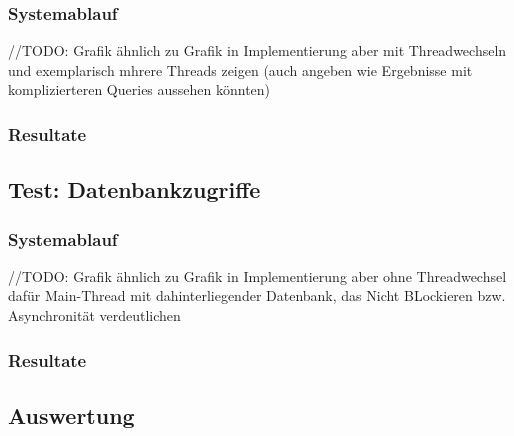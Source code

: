 \subsubsection{Systemablauf}
//TODO: Grafik ähnlich zu Grafik in Implementierung aber mit Threadwechseln und exemplarisch mhrere Threads zeigen
(auch angeben wie Ergebnisse mit komplizierteren Queries aussehen könnten)
\subsubsection{Resultate}

\subsection{Test: Datenbankzugriffe}
\label{section:datenbankzugriffe}

\subsubsection{Systemablauf}
//TODO: Grafik ähnlich zu Grafik in Implementierung aber ohne Threadwechsel dafür Main-Thread mit dahinterliegender Datenbank,
das Nicht BLockieren bzw. Asynchronität verdeutlichen

\subsubsection{Resultate}

\subsection{Auswertung}
\label{section:auswertung}